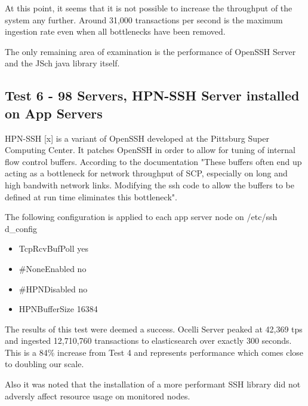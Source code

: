 \documentclass{llncs}
\begin{document}
At this point, it seems that it is not possible to increase the throughput of the system any further. Around 31,000 transactions per second is the maximum ingestion rate even when all bottlenecks have been removed. 

The only remaining area of examination is the performance of OpenSSH Server and the JSch java library itself.

\subsection{Test 6 - 98 Servers, HPN-SSH Server installed on App Servers}

HPN-SSH [x] is a variant of OpenSSH developed at the Pittsburg Super Computing Center. It patches OpenSSH in order to allow for tuning of internal flow control buffers. According to the documentation "These buffers often end up acting as a bottleneck for network throughput of SCP, especially on long and high bandwith network links. Modifying the ssh code to allow the buffers to be defined at run time eliminates this bottleneck".

The following configuration is applied to each app server node on /etc/ssh d\_config

\begin{itemize}
\item TcpRcvBufPoll yes
\item \#NoneEnabled no
\item \#HPNDisabled no
\item HPNBufferSize 16384
\end{itemize}

The results of this test were deemed a success.  Ocelli Server peaked at 42,369 tps and ingested 12,710,760 transactions to elasticsearch over exactly 300 seconds. This is a 84\% increase from Test 4 and represents performance which comes close to doubling our scale.

Also it was noted that the installation of a more performant SSH library did not adversly affect resource usage on monitored nodes.
\end{document}
